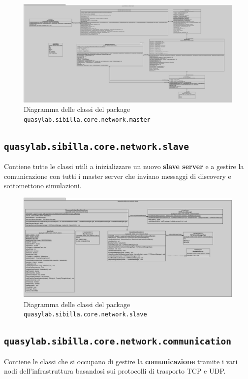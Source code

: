 \begin{figure}[H]
    \includegraphics[width=\linewidth]{images/quasylab.sibilla.core.network.master.png}
    \captionsetup{justification=centering}
    \caption{Diagramma delle classi del package \texttt{quasylab.sibilla.core.network.master}}
  \end{figure}

\subsection{\texttt{quasylab.sibilla.core.network.slave}} Contiene tutte le classi utili a inizializzare un nuovo \textbf{slave server} e a gestire la comunicazione con tutti i master server che inviano messaggi di discovery e sottomettono simulazioni.

\begin{figure}[H]
    \includegraphics[width=\linewidth]{images/quasylab.sibilla.core.network.slave.png}
    \captionsetup{justification=centering}
    \caption{Diagramma delle classi del package \texttt{quasylab.sibilla.core.network.slave}}
  \end{figure}

\subsection{\texttt{quasylab.sibilla.core.network.communication}} Contiene le classi che si occupano di gestire la \textbf{comunicazione} tramite i vari nodi dell’infrastruttura basandosi sui protocolli di trasporto TCP e UDP. 

